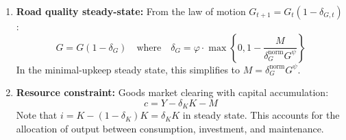 \begin{enumerate}
    \item \textbf{Road quality steady-state:} From the law of motion $G_{t+1} = G_t(1-\delta_{G,t})$:
    \begin{equation} 
    G = G(1-\delta_G) \quad \text{where} \quad \delta_G = \varphi \cdot \max\left\{0, 1 - \frac{M}{\delta_G^{\text{norm}} G^{\psi}}\right\}
    \end{equation}
    In the minimal-upkeep steady state, this simplifies to $M = \delta_G^{\text{norm}} G^{\psi}$.

    \item \textbf{Resource constraint:} Goods market clearing with capital accumulation:
    \begin{equation}
    c = Y - \delta_K K - M
    \end{equation}
    Note that $i = K - (1-\delta_K)K = \delta_K K$ in steady state. This accounts for the allocation of output between consumption, investment, and maintenance.
\end{enumerate}






